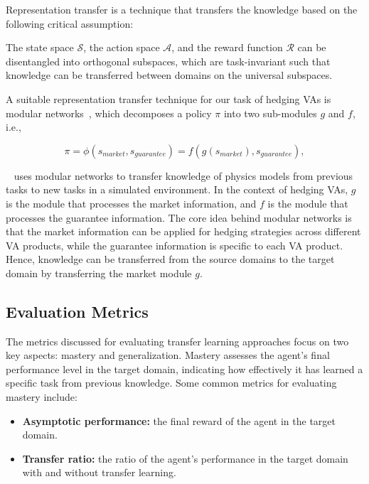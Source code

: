 Representation transfer is a technique that transfers the knowledge based on the following critical assumption:

\begin{assumption}
    The state space $\mathcal{S}$, the action space $\mathcal{A}$, and the reward function $\mathcal{R}$ can be disentangled into orthogonal subspaces, which are task-invariant such that knowledge can be transferred between domains on the universal subspaces.
\end{assumption}

A suitable representation transfer technique for our task of hedging VAs is modular networks~\citep{andreas2017modular}, which decomposes a policy $\pi$ into two sub-modules $g$ and $f$, i.e.,

\begin{equation}
    \pi = \phi(s_{market}, s_{guarantee}) = f(g(s_{market}), s_{guarantee}),
\end{equation}

~\cite{zhang2018decoupling} uses modular networks to transfer knowledge of physics models from previous tasks to new tasks in a simulated environment.
In the context of hedging VAs, $g$ is the module that processes the market information, and $f$ is the module that processes the guarantee information.
The core idea behind modular networks is that the market information can be applied for hedging strategies across different VA products, while the guarantee information is specific to each VA product.
Hence, knowledge can be transferred from the source domains to the target domain by transferring the market module $g$.

\subsection{Evaluation Metrics}

The metrics discussed for evaluating transfer learning approaches focus on two key aspects: mastery and generalization. 
Mastery assesses the agent's final performance level in the target domain, indicating how effectively it has learned a specific task from previous knowledge. 
Some common metrics for evaluating mastery include:

\begin{itemize}
    \item \textbf{Asymptotic performance:} the final reward of the agent in the target domain.
    \item \textbf{Transfer ratio:} the ratio of the agent's performance in the target domain with and without transfer learning.
\end{itemize}

